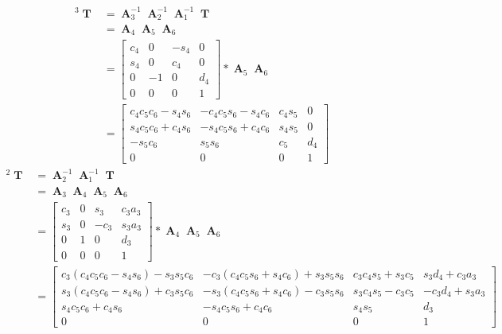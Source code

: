 \documentclass[12pt]{article}
\DeclareMathOperator{\A}{\mathbf{A}}
\DeclareMathOperator{\T}{\mathbf{T}}
\begin{document}
  \begin{align*}
  ^{3}\T & = \A_3^{-1}\A_2^{-1}\A_1^{-1}\T\\
    & = \A_4\A_5\A_6\\
    & =
    \begin{bmatrix}
      c_4 & 0 & -s_4 & 0\\
      s_4 & 0 & c_4 & 0\\
      0 & -1 & 0 & d_4\\
      0 & 0 & 0 & 1
    \end{bmatrix} * \A_5\A_6\\
    & =
    \begin{bmatrix}
      c_4c_5c_6-s_4s_6 & -c_4c_5s_6-s_4c_6 & c_4s_5 & 0\\
      s_4c_5c_6+c_4s_6 & -s_4c_5s_6+c_4c_6 & s_4s_5 & 0\\
      -s_5c_6 & s_5s_6 & c_5 & d_4\\
      0 & 0 & 0 & 1
    \end{bmatrix}
  \end{align*}
  \begin{align*}
  ^{2}\T & = \A_2^{-1}\A_1^{-1}\T\\
    & = \A_3\A_4\A_5\A_6\\
    & =
    \begin{bmatrix}
      c_3 & 0 & s_3 & c_3a_3\\
      s_3 & 0 & -c_3 & s_3a_3\\
      0 & 1 & 0 & d_3\\
      0 & 0 & 0 & 1
    \end{bmatrix} * \A_4\A_5\A_6\\
    & =
    \begin{bmatrix}
      c_3(c_4c_5c_6-s_4s_6)-s_3s_5c_6 & -c_3(c_4c_5s_6+s_4c_6)+s_3s_5s_6 & c_3c_4s_5+s_3c_5 & s_3d_4+c_3a_3\\
      s_3(c_4c_5c_6-s_4s_6)+c_3s_5c_6 & -s_3(c_4c_5s_6+s_4c_6)-c_3s_5s_6 & s_3c_4s_5-c_3c_5 & -c_3d_4+s_3a_3\\
      s_4c_5c_6+c_4s_6 & -s_4c_5s_6+c_4c_6 & s_4s_5 & d_3\\
      0 & 0 & 0 & 1
    \end{bmatrix}
  \end{align*}
\end{document}
